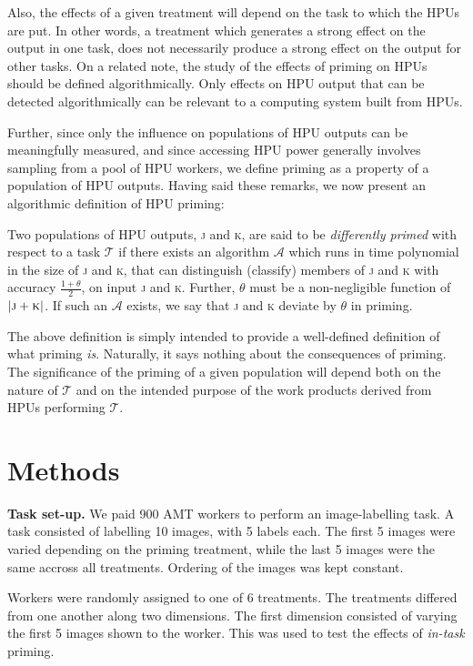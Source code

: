 \documentclass[letterpaper, 11pt, twocolumn]{article}
\begin{document}
Also, the effects of a given treatment will depend on the task to which the 
HPUs are put.  In other words, a treatment which generates a strong effect on
the output in one task, does not necessarily produce a strong effect on the
output for other tasks.  On a related note, the study of the effects of priming
on HPUs should be defined algorithmically.  Only effects on HPU output that
can be detected algorithmically can be relevant to a computing system built 
from HPUs.

Further, since only the influence on populations of HPU outputs can be 
meaningfully measured, and since accessing HPU power generally involves 
sampling from a pool of HPU workers, we define priming as a property of a 
population of HPU outputs.  Having said these remarks, we now present an
algorithmic definition of HPU priming:

Two populations of HPU outputs, \textsc{j} and \textsc{k}, are said to be 
\textit{differently primed} with respect to a task $\mathcal{T}$ if there 
exists an algorithm $\mathcal{A}$ which runs in time polynomial in the size
of \textsc{j} and \textsc{k}, that can distinguish 
(classify) members of \textsc{j} and \textsc{k} with accuracy 
$\frac{1+\theta}{2}$, on input \textsc{j} and \textsc{k}.  Further, $\theta$
must be a non-negligible function of $|\textsc{j} + \textsc{k}|$.
If such an $\mathcal{A}$ exists, 
we say that \textsc{j} and \textsc{k} deviate by $\theta$ in priming.

The above definition is simply intended to provide a well-defined definition
of what priming \textit{is}.  Naturally, it says nothing about the consequences
of priming.  The significance of the priming of a given population will
depend both on the nature of $\mathcal{T}$ and on the intended purpose of 
the work products derived from HPUs performing $\mathcal{T}$.


\section*{Methods}

\textbf{Task set-up.}
We paid 900 AMT workers to perform an image-labelling task.  A task consisted 
of labelling 10 images, with 5 labels each.  The first 5 images were varied 
depending on the priming treatment, while the last 5 images were the same 
accross all treatments.  Ordering of the images was kept constant.

Workers were randomly assigned to one of 6 treatments.  The treatments differed
from one another along two dimensions. The first dimension consisted of 
varying the first 5 images shown to the worker.  This was used to test the
effects of \textit{in-task} priming.
\end{document}
